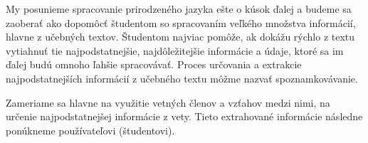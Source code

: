 My posunieme spracovanie prirodzeného jazyka ešte o kúsok ďalej a budeme sa zaoberať ako dopomôcť študentom so spracovaním veľkého množstva informácií, hlavne z učebných textov. Študentom najviac pomôže, ak dokážu rýchlo z textu vytiahnuť tie najpodstatnejšie, najdôležitejšie informácie a údaje, ktoré sa im ďalej budú omnoho ľahšie spracovávať. Proces určovania a extrakcie najpodstatnejších informácií z učebného textu môžme nazvať spoznamkovávanie.

Zameriame sa hlavne na využitie vetných členov a vzťahov medzi nimi, na určenie najpodstatnejšej informácie z vety. Tieto extrahované informácie následne ponúkneme používateľovi (študentovi).